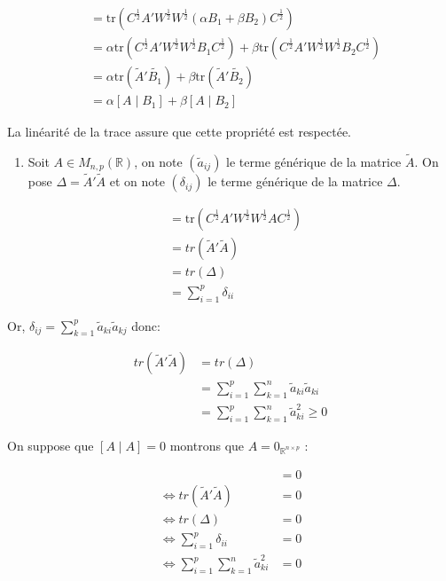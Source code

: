 \documentclass[
]{article}
\providecommand{\tightlist}{%
  \setlength{\itemsep}{0pt}\setlength{\parskip}{0pt}}
\begin{document}
\begin{align*}
[A \mid (\alpha B_1 + \beta B_2)] &= \text{tr}(C^{\frac{1}{2}} A' W^{\frac{1}{2}} W^{\frac{1}{2}} (\alpha B_1 + \beta B_2) C^{\frac{1}{2}}) \\
&= \alpha \text{tr}(C^{\frac{1}{2}} A' W^{\frac{1}{2}} W^{\frac{1}{2}} B_1 C^{\frac{1}{2}}) + \beta \text{tr}(C^{\frac{1}{2}} A' W^{\frac{1}{2}} W^{\frac{1}{2}} B_2 C^{\frac{1}{2}}) \\
&= \alpha \text{tr}(\tilde{A}'\tilde{B_1}) + \beta \text{tr}(\tilde{A}'\tilde{B_2})\\
&= \alpha [A \mid B_1] + \beta [A \mid B_2] 
\end{align*}

La linéarité de la trace assure que cette propriété est respectée.

\begin{enumerate}
\def\labelenumi{(\roman{enumi})}
\setcounter{enumi}{2}
\tightlist
\item
  Soit \(A \in M_{n,p}(\mathbb{R})\), on note \((\tilde{a}_{ij})\) le
  terme générique de la matrice \(\tilde{A}\). On pose
  \(\Delta = \tilde{A}'\tilde{A}\) et on note \((\delta_{ij})\) le terme
  générique de la matrice \(\Delta\).
\end{enumerate}

\begin{align*}
[A \mid A] &= \text{tr}(C^{\frac{1}{2}} A' W^{\frac{1}{2}} W^{\frac{1}{2}} A C^{\frac{1}{2}})\\
&= tr(\tilde{A}'\tilde{A})\\
&= tr(\Delta)\\
&= \sum_{i=1}^{p} \delta_{ii}
\end{align*}

Or, \(\delta_{ij} = \sum_{k=1}^{p} \tilde{a}_{ki} \tilde{a}_{kj}\) donc:

\begin{align*}
tr(\tilde{A}'\tilde{A}) &= tr(\Delta)\\
&= \sum_{i=1}^{p} \sum_{k=1}^{n} \tilde{a}_{ki} \tilde{a}_{ki}\\
&= \sum_{i=1}^{p} \sum_{k=1}^{n} \tilde{a}_{ki}^2 \geq 0
\end{align*}

On suppose que \([A \mid A] = 0\) montrons que
\(A = 0_{\mathbb{R}^{n \times p}}\) :

\begin{align*}
[A \mid A] &= 0\\
\iff tr(\tilde{A}'\tilde{A}) &= 0\\
\iff tr(\Delta) &= 0\\
\iff \sum_{i=1}^{p} \delta_{ii} &= 0\\
\iff \sum_{i=1}^{p} \sum_{k=1}^{n} \tilde{a}_{ki}^2 &= 0
\end{align*}
\end{document}
